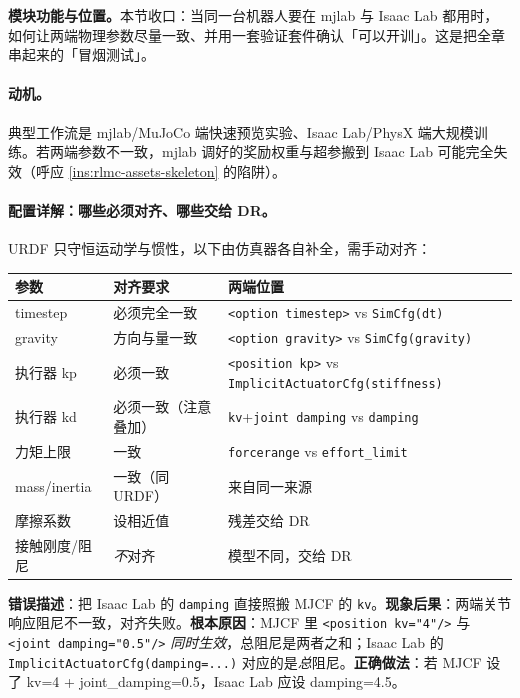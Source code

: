 \textbf{模块功能与位置。}本节收口：当同一台机器人要在 mjlab 与 Isaac Lab 都用时，如何让两端物理参数尽量一致、并用一套验证套件确认「可以开训」。这是把全章串起来的「冒烟测试」。

\paragraph{动机。}典型工作流是 mjlab/MuJoCo 端快速预览实验、Isaac Lab/PhysX 端大规模训练。若两端参数不一致，mjlab 调好的奖励权重与超参搬到 Isaac Lab 可能完全失效（呼应 \cref{ins:rlmc-assets-skeleton} 的陷阱）。

\paragraph{配置详解：哪些必须对齐、哪些交给 DR。}URDF 只守恒运动学与惯性，以下由仿真器各自补全，需手动对齐：

\begin{center}
\small
\begin{tabular}{@{}lll@{}}
\toprule
参数 & 对齐要求 & 两端位置 \\
\midrule
timestep & 必须完全一致 & \texttt{<option timestep>} vs \texttt{SimCfg(dt)} \\
gravity & 方向与量一致 & \texttt{<option gravity>} vs \texttt{SimCfg(gravity)} \\
执行器 kp & 必须一致 & \texttt{<position kp>} vs \texttt{ImplicitActuatorCfg(stiffness)} \\
执行器 kd & 必须一致（注意叠加） & \texttt{kv}+\texttt{joint damping} vs \texttt{damping} \\
力矩上限 & 一致 & \texttt{forcerange} vs \texttt{effort\_limit} \\
mass/inertia & 一致（同 URDF） & 来自同一来源 \\
摩擦系数 & 设相近值 & 残差交给 DR \\
接触刚度/阻尼 & \emph{不}对齐 & 模型不同，交给 DR \\
\bottomrule
\end{tabular}
\end{center}

\begin{pitfall}
\textbf{错误描述}：把 Isaac Lab 的 \texttt{damping} 直接照搬 MJCF 的 \texttt{kv}。\textbf{现象后果}：两端关节响应阻尼不一致，对齐失败。\textbf{根本原因}：MJCF 里 \texttt{<position kv="4"/>} 与 \texttt{<joint damping="0.5"/>} \emph{同时生效}，总阻尼是两者之和；Isaac Lab 的 \texttt{ImplicitActuatorCfg(damping=...)} 对应的是\emph{总}阻尼。\textbf{正确做法}：若 MJCF 设了 kv=4 + joint\_damping=0.5，Isaac Lab 应设 damping=4.5。
\end{pitfall}

